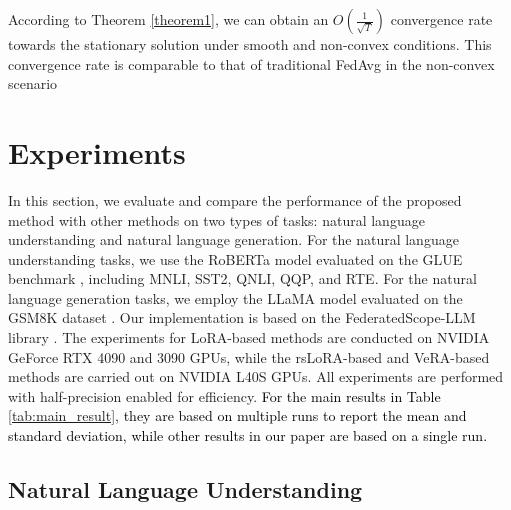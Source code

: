 \documentclass{article} %
\newcommand{\pengxin}[1]{\textcolor{black}{#1}}
\begin{document}
According to Theorem \ref{theorem1}, we can obtain an $O(\frac{1}{\sqrt{T}})$ convergence rate towards the stationary solution under smooth and non-convex conditions. This convergence rate is comparable to that of traditional FedAvg in the non-convex scenario 
\pengxin{\citep{yu2019parallel}}

\section{Experiments} \label{sec:exp}

In this section, we evaluate and compare the performance of the proposed method with other methods on two types of tasks: natural language understanding and natural language generation. For the natural language understanding tasks, we use the RoBERTa model \citep{liu2019roberta} evaluated on the GLUE benchmark \citep{wang2018glue}, including MNLI, SST2, QNLI, QQP, and RTE. For the natural language generation tasks, we employ the LLaMA model \citep{touvron2023llama} evaluated on the GSM8K dataset \citep{cobbe2021training}. Our implementation is based on the FederatedScope-LLM library \citep{kuang2023federatedscope}. The experiments for LoRA-based methods are conducted on NVIDIA GeForce RTX 4090 and 3090 GPUs, while the rsLoRA-based and VeRA-based methods are carried out on NVIDIA L40S GPUs. All experiments are performed with half-precision enabled for efficiency. \pengxin{For the main results in Table \ref{tab:main_result}, they are based on multiple runs to report the mean and standard deviation, while other results in our paper are based on a single run.}

\subsection{Natural Language Understanding} \label{sec:exp_glue_main}
\end{document}
